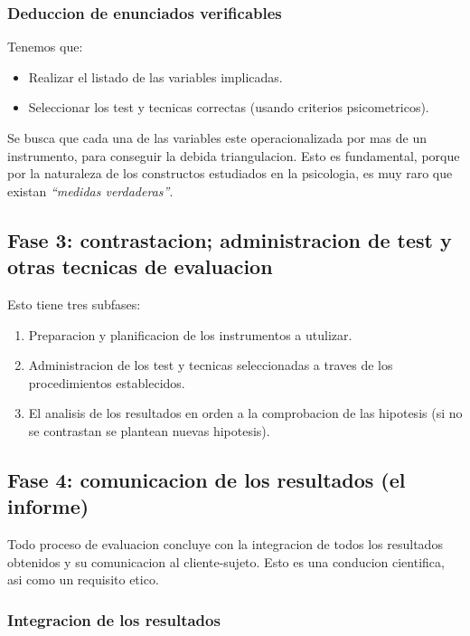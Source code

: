 \documentclass[12pt,a4paper]{article}
\begin{document}
\subsubsection{Deduccion de enunciados verificables}%

Tenemos que:

\begin{itemize}
	\item Realizar el listado de las variables implicadas.
	\item Seleccionar los test y tecnicas correctas (usando criterios psicometricos).
\end{itemize}

Se busca que cada una de las variables este operacionalizada por mas de un instrumento, para conseguir la debida triangulacion. Esto es fundamental, porque por la naturaleza de los constructos estudiados en la psicologia, es muy raro que existan \textit{\enquote{medidas verdaderas}}. 

\subsection{Fase 3: contrastacion; administracion de test y otras tecnicas de evaluacion}%

Esto tiene tres subfases:

\begin{enumerate}
	\item Preparacion y planificacion de los instrumentos a utulizar.
	\item Administracion de los test y tecnicas seleccionadas a traves de los procedimientos establecidos. 
	\item El analisis de los resultados en orden a la comprobacion de las hipotesis (si no se contrastan se plantean nuevas hipotesis).
\end{enumerate}

\subsection{Fase 4: comunicacion de los resultados (el informe)}%

Todo proceso de evaluacion concluye con la integracion de todos los resultados obtenidos y su comunicacion al cliente-sujeto. Esto es una conducion cientifica, asi como un requisito etico. 

\subsubsection{Integracion de los resultados}%
\end{document}
